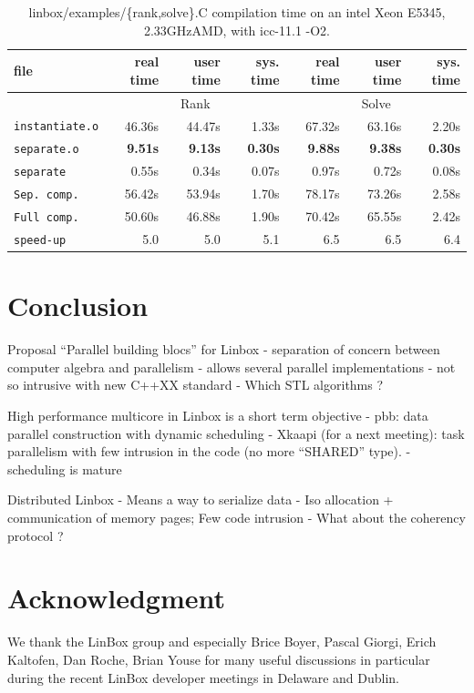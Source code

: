 \documentclass{article}
\newcommand{\linbox}{{\sc LinBox}\xspace}
\begin{document}
\begin{table}[ht]\center
\begin{tabular}{|l||r|r|r||r|r|r|}
\hline
file                      &  real time   &  user time   &  sys. time  &  real time   &  user time   &  sys. time \\
\hline
 & \multicolumn{3}{|c||}{Rank}& \multicolumn{3}{|c|}{Solve}\\
\hline
\texttt{instantiate.o} & 46.36s & 44.47s & 1.33s & 67.32s & 63.16s & 2.20s\\
\texttt{separate.o} & \bf 9.51s & \bf 9.13s & \bf 0.30s & \bf 9.88s & \bf 9.38s & \bf 0.30s\\
\texttt{separate} & 0.55s & 0.34s & 0.07s & 0.97s & 0.72s & 0.08s\\
\hline
\texttt{Sep. comp.} & 56.42s & 53.94s & 1.70s & 78.17s & 73.26s & 2.58s\\
\hline
\texttt{Full comp.} & 50.60s & 46.88s & 1.90s & 70.42s & 65.55s & 2.42s\\
\hline
\hline
\texttt{speed-up} & 5.0 & 5.0 & 5.1 & 6.5 & 6.5 & 6.4\\
\hline
\end{tabular} 
\caption{linbox/examples/\{rank,solve\}.C compilation time on an intel
  Xeon E5345, 2.33GHzAMD, with icc-11.1 -O2.}\label{tab:icccomp}
\end{table}


\section{Conclusion}

Proposal ``Parallel building blocs'' for Linbox
- separation of concern between computer algebra and parallelism
- allows several parallel implementations
- not so intrusive with new C++XX standard
- Which STL algorithms ?


High performance multicore in Linbox is a short term
objective
- pbb: data parallel construction with dynamic scheduling
- Xkaapi (for a next meeting): task parallelism with few
intrusion in the code (no more ``SHARED'' type).
- scheduling is mature

Distributed Linbox
- Means a way to serialize data
- Iso allocation + communication of memory pages; Few code intrusion
- What about the coherency protocol ?

\section*{Acknowledgment}
We thank the \linbox group and especially Brice Boyer, Pascal Giorgi,
Erich Kaltofen, Dan Roche, Brian Youse for many useful discussions 
in particular during the recent \linbox developer meetings in
Delaware and Dublin.


 
\end{document}
